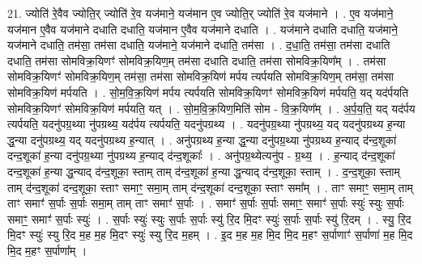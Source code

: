 \documentclass[17pt]{extarticle}
\begin{document}
21. ज्योति॑ रे॒वैव ज्योति॒र् ज्योति॑ रे॒व यज॑माने॒ यज॑मान ए॒व ज्योति॒र् ज्योति॑ रे॒व यज॑माने । . ए॒व यज॑माने॒ यज॑मान ए॒वैव यज॑माने दधाति दधाति॒ यज॑मान ए॒वैव यज॑माने दधाति । . यज॑माने दधाति दधाति॒ यज॑माने॒ यज॑माने दधाति॒ तम॑सा॒ तम॑सा दधाति॒ यज॑माने॒ यज॑माने दधाति॒ तम॑सा । . द॒धा॒ति॒ तम॑सा॒ तम॑सा दधाति दधाति॒ तम॑सा सोमविक्र॒यिणꣳ॑ सोमविक्र॒यिण॒म् तम॑सा दधाति दधाति॒ तम॑सा सोमविक्र॒यिण᳚म् । . तम॑सा सोमविक्र॒यिणꣳ॑ सोमविक्र॒यिण॒म् तम॑सा॒ तम॑सा सोमविक्र॒यिण॑ मर्पय त्यर्पयति सोमविक्र॒यिण॒म् तम॑सा॒ तम॑सा सोमविक्र॒यिण॑ मर्पयति । . सो॒म॒वि॒क्र॒यिण॑ मर्पय त्यर्पयति सोमविक्र॒यिणꣳ॑ सोमविक्र॒यिण॑ मर्पयति॒ यद् यद॑र्पयति सोमविक्र॒यिणꣳ॑ सोमविक्र॒यिण॑ मर्पयति॒ यत् । . सो॒म॒वि॒क्र॒यिण॒मिति॑ सोम - वि॒क्र॒यिण᳚म् । . अ॒र्प॒य॒ति॒ यद् यद॑र्पय त्यर्पयति॒ यदनु॑पग्र॒थ्या नु॑पग्रथ्य॒ यद॑र्पय त्यर्पयति॒ यदनु॑पग्रथ्य । . यदनु॑पग्र॒थ्या नु॑पग्रथ्य॒ यद् यदनु॑पग्रथ्य ह॒न्या द्ध॒न्या दनु॑पग्रथ्य॒ यद् यदनु॑पग्रथ्य ह॒न्यात् । . अनु॑पग्रथ्य ह॒न्या द्ध॒न्या दनु॑पग्र॒थ्या नु॑पग्रथ्य ह॒न्याद् द॑न्द॒शूका॑ दन्द॒शूका॑ ह॒न्या दनु॑पग्र॒थ्या नु॑पग्रथ्य ह॒न्याद् द॑न्द॒शूकाः᳚ । . अनु॑पग्र॒थ्येत्यनु॑प - ग्र॒थ्य॒ । . ह॒न्याद् द॑न्द॒शूका॑ दन्द॒शूका॑ ह॒न्या द्ध॒न्याद् द॑न्द॒शूका॒ स्ताम् ताम् द॑न्द॒शूका॑ ह॒न्या द्ध॒न्याद् द॑न्द॒शूका॒ स्ताम् । . द॒न्द॒शूका॒ स्ताम् ताम् द॑न्द॒शूका॑ दन्द॒शूका॒ स्ताꣳ समाꣳ॒॒ समा॒म् ताम् द॑न्द॒शूका॑ दन्द॒शूका॒ स्ताꣳ समा᳚म् । . ताꣳ समाꣳ॒॒ समा॒म् ताम् ताꣳ समाꣳ॑ स॒र्पाः स॒र्पाः समा॒म् ताम् ताꣳ समाꣳ॑ स॒र्पाः । . समाꣳ॑ स॒र्पाः स॒र्पाः समाꣳ॒॒ समाꣳ॑ स॒र्पाः स्युः॑ स्युः स॒र्पाः समाꣳ॒॒ समाꣳ॑ स॒र्पाः स्युः॑ । . स॒र्पाः स्युः॑ स्युः स॒र्पाः स॒र्पाः स्यु॑ रि॒द मि॒दꣳ स्युः॑ स॒र्पाः स॒र्पाः स्यु॑ रि॒दम् । . स्यु॒ रि॒द मि॒दꣳ स्युः॑ स्यु रि॒द म॒ह म॒ह मि॒दꣳ स्युः॑ स्यु रि॒द म॒हम् । . इ॒द म॒ह म॒ह मि॒द मि॒द म॒हꣳ स॒र्पाणाꣳ॑ स॒र्पाणा॑ म॒ह मि॒द मि॒द म॒हꣳ स॒र्पाणा᳚म् । \newline
\end{document}
